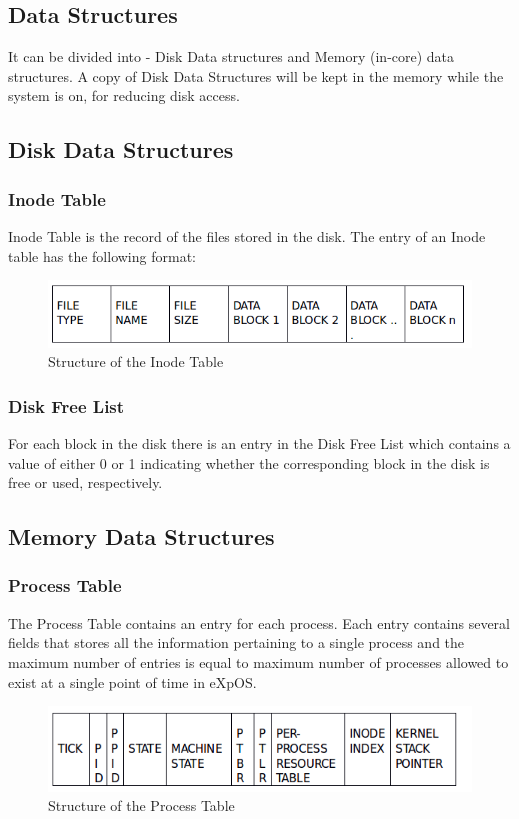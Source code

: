 \documentclass[10pt]{article}
\begin{document}
\subsection{Data Structures}
It can be divided into - Disk Data structures and Memory (in-core) data structures. A copy of Disk Data Structures will be kept in the memory while the system is on, for reducing disk access.
\subsection{Disk Data Structures}
\subsubsection{Inode Table}
Inode Table is the record of the files stored in the disk. The entry of an Inode table has the following format:
\begin{figure}[ht]
\centering
\includegraphics[scale=0.50]{Inode_table.png}
\caption{\footnotesize Structure of the Inode Table}
\label{fig_1}
\end{figure}
\subsubsection{Disk Free List}
For each block in the disk there is an entry in the Disk Free List which contains a value of either 0 or 1 indicating whether the corresponding block in the disk is free or used, respectively.
\subsection{Memory Data Structures}
\subsubsection{Process Table}
 The Process Table contains an entry for each process.  Each entry contains several fields that stores all the information pertaining to a single process and the maximum number of entries is equal to maximum number of processes allowed to exist at a single point of time in eXpOS.
\begin{figure}[ht]
\centering
\includegraphics[scale=0.50]{Process_table.png}
\caption{\footnotesize Structure of the Process Table}
\label{fig_1}
\end{figure}
\end{document}
